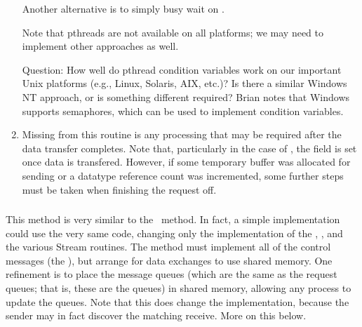 \begin{enumerate}
  Another alternative is to simply busy wait on
  . 
  
  Note that pthreads are not available on all platforms; we may need to
  implement other approaches as well.
  
  Question: How well do pthread condition variables work on our important Unix
  platforms (e.g., Linux, Solaris, AIX, etc.)?  Is there a similar Windows NT
  approach, or is something different required?  Brian notes that Windows
  supports semaphores, which can be used to implement condition variables.

\item Missing from this routine is any processing that may be required after
  the data transfer completes.  Note that, particularly in the case of
  , the  field is set once data is
  transfered.  However, if some temporary buffer was allocated for sending or
  a datatype reference count was incremented, some further steps must be taken
  when finishing the request off.
\end{enumerate}

\ifcodefirst
\else
{}
\fi

%

\subsubsection{\shmemname}

This method is very similar to the \tcpname\ method.  In fact, a simple
implementation could use the very same code, changing only the implementation
of the , , and the various
Stream routines.  The method must implement all of the control messages (the
), but arrange for data exchanges to use shared
memory.  One refinement is to place the message queues (which are the same as
the request queues; that is, these are the  queues)
in shared memory, 
allowing any process to update the queues.  Note that this does change the
 implementation, because the sender may in fact discover
the matching receive.  More on this below.

